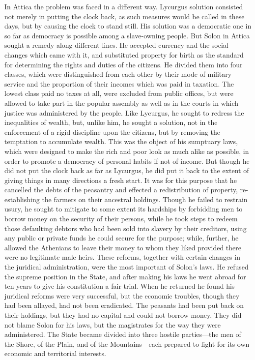 \documentclass{book}
\begin{document}
In Attica the problem was faced in a different way. Lycurgus solution consisted not merely in putting the clock back, as such measures would be called in these days, but by causing the clock to stand still. His solution was a democratic one in so far as democracy is possible among a slave-owning people. But Solon in Attica sought a remedy along different lines. He accepted currency and the social changes which came with it, and substituted property for birth as the standard for determining the rights and duties of the citizens. He divided them into four classes, which were distinguished from each other by their mode of military service and the proportion of their incomes which was paid in taxation. The lowest class paid no taxes at all, were excluded from public offices, but were allowed to take part in the popular assembly as well as in the courts in which justice was administered by the people. Like Lycurgus, he sought to redress the inequalities of wealth, but, unlike him, he sought a solution, not in the enforcement of a rigid discipline upon the citizens, but by removing the temptation to accumulate wealth. This was the object of his sumptuary laws, which were designed to make the rich and poor look as much alike as possible, in order to promote a democracy of personal habits if not of income. But though he did not put the clock back as far as Lycurgus, he did put it back to the extent of giving things in many directions a fresh start. It was for this purpose that he cancelled the debts of the peasantry and effected a redistribution of property, re-establishing the farmers on their ancestral holdings. Though he failed to restrain usury, he sought to mitigate to some extent its hardships by forbidding men to borrow money on the security of their persons, while he took steps to redeem those defaulting debtors who had been sold into slavery by their creditors, using any public or private funds he could secure for the purpose; while, further, he allowed the Athenians to leave their money to whom they liked provided there were no legitimate male heirs. These reforms, together with certain changes in the juridical administration, were the most important of Solon’s laws. He refused the supreme position in the State, and after making his laws he went abroad for ten years to give his constitution a fair trial. When he returned he found his juridical reforms were very successful, but the economic troubles, though they had been allayed, had not been eradicated. The peasants had been put back on their holdings, but they had no capital and could not borrow money. They did not blame Solon for his laws, but the magistrates for the way they were administered. The State became divided into three hostile parties—the men of the Shore, of the Plain, and of the Mountains—each prepared to fight for its own economic and territorial interests.
\end{document}
